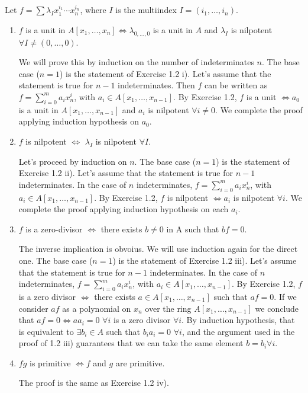 \begin{sol}
	Let $f = \sum \lambda_{I} x_1^{i_1} \cdots x_n^{i_n}$, where $I$ is the multiindex $I = (i_1, \dots, i_n)$.

	\begin{enumerate}[label=(\roman*)]
		\item $f$ is a unit in $A[x_1, \dots, x_n] \iff \lambda_{0,\dots,0}$ is a unit in $A$ and $\lambda_I$ is nilpotent $\forall I \neq (0, \dots, 0)$. 

		We will prove this by induction on the number of indeterminates $n$. The base case ($n = 1$) is the statement of Exercise 1.2 i). Let's assume that the statement is true for $n-1$ indeterminates. Then $f$ can be written as $f = \sum_{i = 0}^m a_i x_n^i$, with $a_i \in A[x_1, \dots, x_{n-1}]$. By Exercise 1.2, $f$ is a unit $\iff a_0$ is a unit in $A[x_1, \dots, x_{n-1}]$ and $a_i$ is nilpotent $\forall i \neq 0$. We complete the proof applying induction hypothesis on $a_0$.

		\item $f$ is nilpotent $\iff$ $\lambda_I$ is nilpotent $\forall I$. 

		Let's proceed by induction on $n$. The base case ($n = 1$) is the statement of Exercise 1.2 ii). Let's assume that the statement is true for $n-1$ indeterminates. In the case of $n$ indeterminates, $f = \sum_{i = 0}^m a_i x_n^i$, with $a_i \in A[x_1, \dots, x_{n-1}]$. By Exercise 1.2, $f$ is nilpotent $\iff a_i$ is nilpotent $\forall i$. We complete the proof applying induction hypothesis on each $a_i$.

		\item $f$ is a zero-divisor $\iff$ there exists $b \neq 0$ in A such that $bf = 0$.

		The inverse implication is obvoius. We will use induction again for the direct one. The base case ($n = 1$) is the statement of Exercise 1.2 iii). Let's assume that the statement is true for $n-1$ indeterminates. In the case of $n$ indeterminates, $f = \sum_{i = 0}^m a_i x_n^i$, with $a_i \in A[x_1, \dots, x_{n-1}]$. By Exercise 1.2, $f$ is a zero divisor $\iff$ there exists $a \in A[x_1, \dots, x_{n-1}]$ such that $af = 0$. If we consider $af$ as a polynomial on $x_n$ over the ring $A[x_1, \dots, x_{n-1}]$ we conclude that $af = 0 \iff a a_i = 0 \, \, \forall i$ is a zero divisor $\forall i$. By induction hypothesis, that is equivalent to $\exists b_i \in A$ such that $b_i a_i = 0 \, \, \forall i$, and the argument used in the proof of 1.2 iii) guarantees that we can take the same element $b = b_i \forall i$.

		\item $fg$ is primitive $\iff f$ and $g$ are primitive.

		The proof is the same as Exercise 1.2 iv).

	\end{enumerate}
\end{sol}

